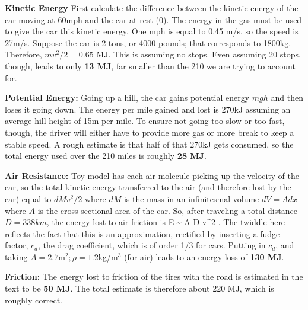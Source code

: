 \documentclass[11pt]{book}
\begin{document}
\bei
\item {\bf Kinetic Energy} First calculate the difference between the kinetic energy of the car moving at 60mph and the car at rest (0). The energy in the gas must be used to give the car this kinetic energy. One mph is equal to 0.45 m/s, so the speed is 27m/s. Suppose the car is 2 tons, or 4000 pounds; that corresponds to 1800kg. Therefore, $mv^2/2=0.65$ MJ. This is assuming no stops. Even assuming 20 stops, though, leads to only {\bf 13 MJ}, far smaller than the 210 we are trying to account for. 
\item {\bf Potential Energy:} Going up a hill, the car gains potential energy $mgh$ and then loses it going down. The energy per mile gained and lost is 270kJ assuming an average hill height of 15m per mile. To ensure not going too slow or too fast, though, the driver will either have to provide more gas or more break to keep a stable speed. A rough estimate is that half of that 270kJ gets consumed, so the total energy used over the 210 miles is roughly {\bf 28 MJ}.
\item {\bf Air Resistance:} Toy model has each air molecule picking up the velocity of the car, so the total kinetic energy transferred to the air (and therefore lost by the car) equal to $dMv^2/2$ where $dM$ is the mass in an infinitesmal volume $dV = Adx$ where $A$ is the cross-sectional area of the car. So, after traveling a total distance $D=338km$, the energy lost to air friction is
\be
\Delta E \sim {} \rho A D v^2
.\ee 
The twiddle here reflects the fact that this is an approximation, rectified by inserting a fudge factor, $c_d$, the drag coefficient, which is of order 1/3 for cars. Putting in $c_d$, and taking $A=2.7$m$^2; \rho=1.2$kg/m$^3$ (for air) leads to an energy loss of {\bf 130 MJ}.
\item {\bf Friction:} The energy lost to friction of the tires with the road is estimated in the text to be {\bf 50 MJ}.
\eei
The total estimate is therefore about 220 MJ, which is roughly correct.

\end{document}
